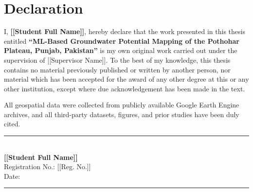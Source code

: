 \chapter*{Declaration}
\thispagestyle{plain}

\noindent
I, \textbf{[[Student Full Name]]}, hereby declare that the work presented in
this thesis entitled \textbf{``ML-Based Groundwater Potential Mapping of the
Pothohar Plateau, Punjab, Pakistan''} is my own original work carried out
under the supervision of [[Supervisor Name]]. To the best of my knowledge,
this thesis contains no material previously published or written by another
person, nor material which has been accepted for the award of any other
degree at this or any other institution, except where due acknowledgement
has been made in the text.

\vspace{0.5cm}

\noindent
All geospatial data were collected from publicly available Google Earth
Engine archives, and all third-party datasets, figures, and prior studies
have been duly cited.

\vspace{3cm}

\noindent
\begin{flushright}
\rule{6cm}{0.4pt}\\
\textbf{[[Student Full Name]]}\\
Registration No.: [[Reg. No.]]\\
Date: \rule{3cm}{0.4pt}
\end{flushright}

\cleardoublepage
